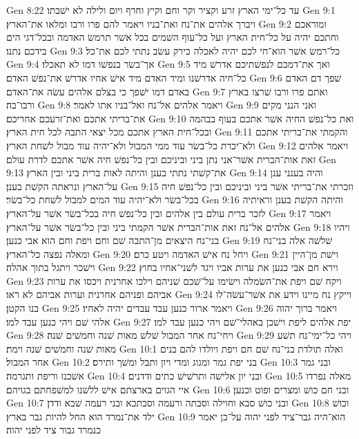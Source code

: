Gen 8:22  עד כל־ימי הארץ זרע וקציר וקר וחם וקיץ וחרף ויום ולילה לא ישׁבתו׃
Gen 9:1  ויברך אלהים את־נח ואת־בניו ויאמר להם פרו ורבו ומלאו את־הארץ׃
Gen 9:2  ומוראכם וחתכם יהיה על כל־חית הארץ ועל כל־עוף השׁמים בכל אשׁר תרמשׂ האדמה ובכל־דגי הים בידכם נתנו׃
Gen 9:3  כל־רמשׂ אשׁר הוא־חי לכם יהיה לאכלה כירק עשׂב נתתי לכם את־כל׃
Gen 9:4  אך־בשׂר בנפשׁו דמו לא תאכלו׃
Gen 9:5  ואך את־דמכם לנפשׁתיכם אדרשׁ מיד כל־חיה אדרשׁנו ומיד האדם מיד אישׁ אחיו אדרשׁ את־נפשׁ האדם׃
Gen 9:6  שׁפך דם האדם באדם דמו ישׁפך כי בצלם אלהים עשׂה את־האדם׃
Gen 9:7  ואתם פרו ורבו שׁרצו בארץ ורבו־בה׃
Gen 9:8  ויאמר אלהים אל־נח ואל־בניו אתו לאמר׃
Gen 9:9  ואני הנני מקים את־בריתי אתכם ואת־זרעכם אחריכם׃
Gen 9:10  ואת כל־נפשׁ החיה אשׁר אתכם בעוף בבהמה ובכל־חית הארץ אתכם מכל יצאי התבה לכל חית הארץ׃
Gen 9:11  והקמתי את־בריתי אתכם ולא־יכרת כל־בשׂר עוד ממי המבול ולא־יהיה עוד מבול לשׁחת הארץ׃
Gen 9:12  ויאמר אלהים זאת אות־הברית אשׁר־אני נתן ביני וביניכם ובין כל־נפשׁ חיה אשׁר אתכם לדרת עולם׃
Gen 9:13  את־קשׁתי נתתי בענן והיתה לאות ברית ביני ובין הארץ׃
Gen 9:14  והיה בענני ענן על־הארץ ונראתה הקשׁת בענן׃
Gen 9:15  וזכרתי את־בריתי אשׁר ביני וביניכם ובין כל־נפשׁ חיה בכל־בשׂר ולא־יהיה עוד המים למבול לשׁחת כל־בשׂר׃
Gen 9:16  והיתה הקשׁת בענן וראיתיה לזכר ברית עולם בין אלהים ובין כל־נפשׁ חיה בכל־בשׂר אשׁר על־הארץ׃
Gen 9:17  ויאמר אלהים אל־נח זאת אות־הברית אשׁר הקמתי ביני ובין כל־בשׂר אשׁר על־הארץ׃
Gen 9:18  ויהיו בני־נח היצאים מן־התבה שׁם וחם ויפת וחם הוא אבי כנען׃
Gen 9:19  שׁלשׁה אלה בני־נח ומאלה נפצה כל־הארץ׃
Gen 9:20  ויחל נח אישׁ האדמה ויטע כרם׃
Gen 9:21  וישׁת מן־היין וישׁכר ויתגל בתוך אהלה׃
Gen 9:22  וירא חם אבי כנען את ערות אביו ויגד לשׁני־אחיו בחוץ׃
Gen 9:23  ויקח שׁם ויפת את־השׂמלה וישׂימו על־שׁכם שׁניהם וילכו אחרנית ויכסו את ערות אביהם ופניהם אחרנית וערות אביהם לא ראו׃
Gen 9:24  וייקץ נח מיינו וידע את אשׁר־עשׂה־לו בנו הקטן׃
Gen 9:25  ויאמר ארור כנען עבד עבדים יהיה לאחיו׃
Gen 9:26  ויאמר ברוך יהוה אלהי שׁם ויהי כנען עבד למו׃
Gen 9:27  יפת אלהים ליפת וישׁכן באהלי־שׁם ויהי כנען עבד למו׃
Gen 9:28  ויחי־נח אחר המבול שׁלשׁ מאות שׁנה וחמשׁים שׁנה׃
Gen 9:29  ויהי כל־ימי־נח תשׁע מאות שׁנה וחמשׁים שׁנה וימת׃
Gen 10:1  ואלה תולדת בני־נח שׁם חם ויפת ויולדו להם בנים אחר המבול׃
Gen 10:2  בני יפת גמר ומגוג ומדי ויון ותבל ומשׁך ותירס׃
Gen 10:3  ובני גמר אשׁכנז וריפת ותגרמה׃
Gen 10:4  ובני יון אלישׁה ותרשׁישׁ כתים ודדנים׃
Gen 10:5  מאלה נפרדו איי הגוים בארצתם אישׁ ללשׁנו למשׁפחתם בגויהם׃
Gen 10:6  ובני חם כושׁ ומצרים ופוט וכנען׃
Gen 10:7  ובני כושׁ סבא וחוילה וסבתה ורעמה וסבתכא ובני רעמה שׁבא ודדן׃
Gen 10:8  וכושׁ ילד את־נמרד הוא החל להיות גבר בארץ׃
Gen 10:9  הוא־היה גבר־ציד לפני יהוה על־כן יאמר כנמרד גבור ציד לפני יהוה׃
